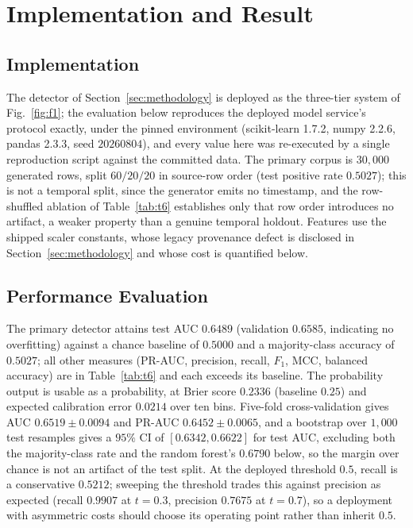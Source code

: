\section{Implementation and Result}
\label{sec:implementation}

\subsection{Implementation}

The detector of Section~\ref{sec:methodology} is deployed as the three-tier
system of Fig.~\ref{fig:f1}; the evaluation below reproduces the deployed
model service's protocol exactly, under the pinned environment (scikit-learn
1.7.2, numpy 2.2.6, pandas 2.3.3, seed $20260804$), and every value here was
re-executed by a single reproduction script against the committed data. The
primary corpus is $30{,}000$ generated rows, split $60/20/20$ in source-row
order (test positive rate $0.5027$); this is not a temporal split, since the
generator emits no timestamp, and the row-shuffled ablation of
Table~\ref{tab:t6} establishes only that row order introduces no artifact, a
weaker property than a genuine temporal holdout. Features use the shipped
scaler constants, whose legacy provenance defect is disclosed in
Section~\ref{sec:methodology} and whose cost is quantified below.

\subsection{Performance Evaluation}

The primary detector attains test AUC $0.6489$ (validation $0.6585$, indicating
no overfitting) against a chance baseline of $0.5000$ and a majority-class
accuracy of $0.5027$; all other measures (PR-AUC, precision, recall, $F_1$,
MCC, balanced accuracy) are in Table~\ref{tab:t6} and each exceeds its
baseline. The probability output is usable as a probability, at Brier score
$0.2336$ (baseline $0.25$) and expected calibration error $0.0214$ over ten
bins. Five-fold
cross-validation gives AUC $0.6519\pm0.0094$ and PR-AUC $0.6452\pm0.0065$, and
a bootstrap over $1{,}000$ test resamples gives a $95\%$ CI of
$[0.6342,0.6622]$ for test AUC, excluding both the majority-class rate and the
random forest's $0.6790$ below, so the margin over chance is not an artifact
of the test split. At the deployed threshold $0.5$, recall is a conservative
$0.5212$; sweeping the threshold trades this against precision as expected
(recall $0.9907$ at $t{=}0.3$, precision $0.7675$ at $t{=}0.7$), so a
deployment with asymmetric costs should choose its operating point rather than
inherit $0.5$.

